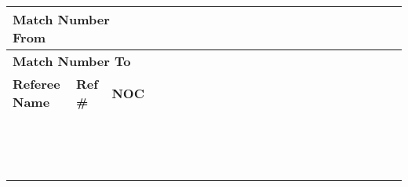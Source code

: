 \documentclass[letterpaper,12pt]{article}
\begin{document}
	
	
	\centering
	\footnotesize %
	\setlength\doublerulesep{0.5cm} 
	\begin{tabular}{|p{4.5cm}|p{1.1cm}|p{1.1cm}
			|p{0.5cm}|p{0.5cm}|p{0.5cm}|p{0.5cm}|p{0.5cm}|p{0.5cm}|p{0.5cm}|p{0.5cm}|p{0.5cm}|p{0.5cm}|p{0.5cm}|p{0.5cm}|p{0.5cm}|p{0.5cm}|p{0.5cm}|p{0.5cm}|p{0.5cm}|p{0.5cm}|p{0.5cm}|p{0.5cm}|}
		\hline
		\multicolumn{3}{|l|}{\textbf{Match Number From}} & & & & & & & & & & & & & & & & & & & & \\
		\hline
		\multicolumn{3}{|l|}{\textbf{Match Number To}} & & & & & & & & & & & & & & & & & & & & \\		
		\hline
		\hline
		\textbf{Referee Name} & \textbf{Ref \#} & \textbf{NOC} & & & & & & & & & & & & & & & & & & & & \\
		\hline
		& & & & & & & & & & & & & & & & & & & & & & \\
		\hline
		& & & & & & & & & & & & & & & & & & & & & & \\
		\hline
		& & & & & & & & & & & & & & & & & & & & & & \\
		\hline
		& & & & & & & & & & & & & & & & & & & & & & \\
		\hline
		& & & & & & & & & & & & & & & & & & & & & & \\
		\hline
		& & & & & & & & & & & & & & & & & & & & & & \\
		\hline
		& & & & & & & & & & & & & & & & & & & & & & \\
		\hline
		& & & & & & & & & & & & & & & & & & & & & & \\
		\hline
		& & & & & & & & & & & & & & & & & & & & & & \\
		\hline
		& & & & & & & & & & & & & & & & & & & & & & \\
		\hline
		& & & & & & & & & & & & & & & & & & & & & & \\
		\hline
		& & & & & & & & & & & & & & & & & & & & & & \\
		\hline
		& & & & & & & & & & & & & & & & & & & & & & \\
		\hline
		& & & & & & & & & & & & & & & & & & & & & & \\
		\hline
		
	\end{tabular}
	
\end{document}
